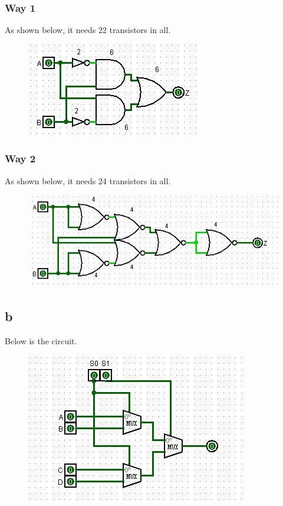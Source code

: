 \documentclass[11pt,a4paper]{article}
\begin{document}
	\subsubsection*{Way 1}
	As shown below, it needs 22 transistors in all.
	\begin{figure}[H]
		\centering
		\includegraphics[width=1\linewidth]{2_a_1.jpg}
		\label{2_a_1}
	\end{figure}
	\subsubsection*{Way 2}
	As shown below, it needs 24 transistors in all.
	\begin{figure}[H]
	\centering
	\includegraphics[width=1\linewidth]{2_a_2.jpg}
	\label{2_a_2}
	\end{figure}


	\subsection*{b}
	Below is the circuit.
	\begin{figure}[H]
		\centering
		\includegraphics[width=1\linewidth]{2_b.jpg}
		\label{2_b}
	\end{figure}
	
\end{document}
